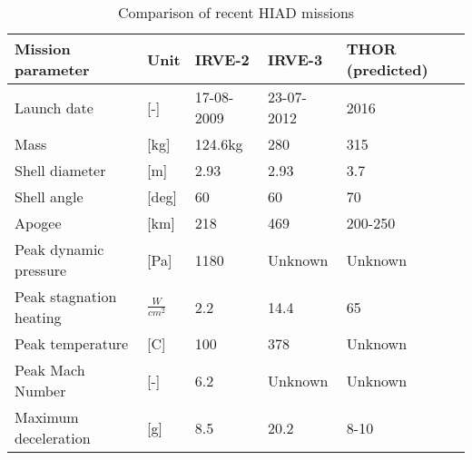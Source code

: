 \begin{table}[h!]
	\caption{Comparison of recent HIAD missions}%
		\begin{tabular}{|p{}|p{}|p{}|p{}|p{}|} %
			\hline

       Mission parameter   &       Unit &     IRVE-2 \cite{Dillman2010} &     IRVE-3 \citep{Dillman2012,Dillman2014} & THOR (predicted) \citep{Dillman2014} \\
			\hline \hline

Launch date &          [-] & 17-08-2009 & 23-07-2012 &       2016 \\
			\hline

      Mass &         [kg] &    124.6kg &        280 &        315 \\
			\hline

Shell diameter &          [m] &       2.93 &       2.93 &        3.7 \\
			\hline

Shell angle &     [deg] &         60 &         60 &         70 \\
			\hline

    Apogee &         [km] &        218 &        469 &    200-250 \\
			\hline

Peak dynamic pressure &         [Pa] &       1180 &   Unknown         &   Unknown         \\
			\hline

Peak stagnation heating &     $ \frac{W}{cm^{2}}$ &        2.2 &       14.4 &         65 \\
			\hline

Peak temperature &          [C] &        100 &        378 &      Unknown      \\
			\hline

Peak Mach Number &          [-] &        6.2 &  Unknown          &   Unknown         \\
			\hline

Maximum deceleration &          [g] &        8.5 &       20.2 &       8-10 \\
			\hline

		\end{tabular}
    \label{tab:hiadcomparison}%
\end{table}

